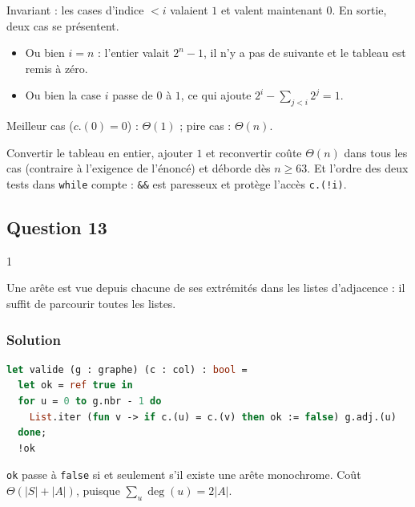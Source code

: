 \documentclass[11pt,a4paper]{article}
\providecommand{\tightlist}{\setlength{\itemsep}{0pt}\setlength{\parskip}{0pt}}
\begin{document}
Invariant : les cases d'indice \(< i\) valaient \(1\) et valent maintenant \(0\). En sortie, deux cas se présentent.

\begin{itemize}
\tightlist
\item
  Ou bien \(i = n\) : l'entier valait \(2^n - 1\), il n'y a pas de suivante et le tableau est remis à zéro.
\item
  Ou bien la case \(i\) passe de \(0\) à \(1\), ce qui ajoute \(2^i - \sum_{j < i} 2^j = 1\).
\end{itemize}

Meilleur cas (\(c.(0) = 0\)) : \(\Theta(1)\) ; pire cas : \(\Theta(n)\).

\begin{piege}

Convertir le tableau en entier, ajouter \(1\) et reconvertir coûte \(\Theta(n)\) dans tous les cas (contraire à l'exigence de l'énoncé) et déborde dès \(n \ge 63\). Et l'ordre des deux tests dans \texttt{while} compte : \texttt{\&\&} est paresseux et protège l'accès \texttt{c.(!i)}.

\end{piege}

\hypertarget{question-13}{%
\subsection{Question 13}\label{question-13}}

\begin{indication}{1}

Une arête est vue depuis chacune de ses extrémités dans les listes d'adjacence : il suffit de parcourir toutes les listes.

\end{indication}

\hypertarget{solution-12}{%
\subsubsection{Solution}\label{solution-12}}

\begin{lstlisting}[language=Caml]
let valide (g : graphe) (c : col) : bool =
  let ok = ref true in
  for u = 0 to g.nbr - 1 do
    List.iter (fun v -> if c.(u) = c.(v) then ok := false) g.adj.(u)
  done;
  !ok
\end{lstlisting}

\texttt{ok} passe à \texttt{false} si et seulement s'il existe une arête monochrome. Coût \(\Theta(|S| + |A|)\), puisque \(\sum_u \deg(u) = 2|A|\).
\end{document}
